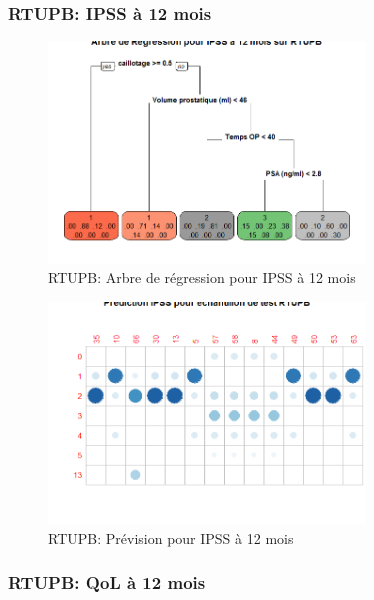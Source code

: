 %
%

%

\subsubsection{RTUPB: IPSS à 12 mois}
\begin{figure}[H]
\centering
\includegraphics[width=0.75\textwidth]{../Fig/RTUPB/rtupb-regtree-ipss12.png}
\caption{RTUPB: Arbre de régression pour IPSS à 12 mois}
\label{fig-rtupb-regtree-ipss12}
\end{figure}

\begin{figure}[H]
\centering
\includegraphics[width=0.75\textwidth]{../Fig/RTUPB/rtupb-regtree-predict-ipss12.png}
\caption{RTUPB: Prévision pour IPSS à 12 mois}
\label{fig-rtupb-regtree-predict-ipss12}
\end{figure}

\subsubsection{RTUPB: QoL à 12 mois}

